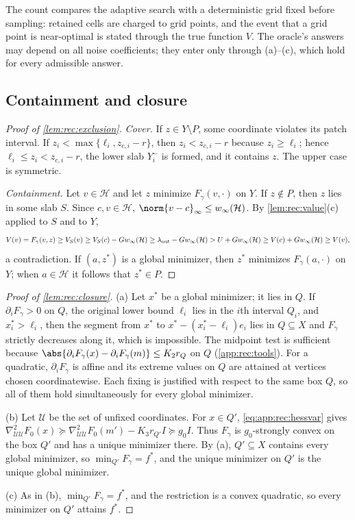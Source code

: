 The count compares the adaptive search with a deterministic grid fixed before
sampling: retained cells are charged to grid points, and the event that a grid
point is near-optimal is stated through the true function $V$. The oracle's
answers may depend on all noise coefficients; they enter only through
(a)--(c), which hold for every admissible answer.

\subsection{Containment and closure}\label{app:rec:certificates}

\begin{proof}[Proof of \cref{lem:rec:exclusion}]
\emph{Cover.} If $z\in Y\setminus P$, some coordinate violates its patch
interval. If $z_i<\max\{\ell_i,z_{c,i}-r\}$, then $z_i<z_{c,i}-r$ because
$z_i\ge\ell_i$; hence $\ell_i\le z_i<z_{c,i}-r$, the lower slab $Y_i^-$ is
formed, and it contains $z$. The upper case is symmetric.

\emph{Containment.} Let $v\in\mathcal H$ and let $z$ minimize
$F_\gamma(v,\cdot)$ on $Y$. If $z\notin P$, then $z$ lies in some slab $S$.
Since $c,v\in\mathcal H$, $\norm{v-c}_\infty\le w_\infty(\mathcal H)$. By
\cref{lem:rec:value}(c) applied to $S$ and to $Y$,
\[
 V(v)=F_\gamma(v,z)\ge V_S(v)\ge V_S(c)-Gw_\infty(\mathcal H)
 \ge\lambda_{\rm out}-Gw_\infty(\mathcal H)>U+Gw_\infty(\mathcal H)
 \ge V(c)+Gw_\infty(\mathcal H)\ge V(v),
\]
a contradiction. If $(a,z^*)$ is a global minimizer, then $z^*$ minimizes
$F_\gamma(a,\cdot)$ on $Y$; when $a\in\mathcal H$ it follows that $z^*\in P$.
\end{proof}

\begin{proof}[Proof of \cref{lem:rec:closure}]
(a) Let $x^*$ be a global minimizer; it lies in $Q$. If $\partial_iF_\gamma>0$
on $Q$, the original lower bound $\ell_i$ lies in the $i$th interval $Q_i$,
and $x^*_i>\ell_i$, then the segment from $x^*$ to
$x^*-(x^*_i-\ell_i)e_i$ lies in $Q\subseteq X$ and $F_\gamma$ strictly
decreases along it, which is impossible. The midpoint test is sufficient
because $\abs{\partial_iF_\gamma(x)-\partial_iF_\gamma(m)}\le K_2r_Q$ on $Q$
(\cref{app:rec:tools}). For a quadratic, $\partial_iF_\gamma$ is affine and
its extreme values on $Q$ are attained at vertices chosen coordinatewise.
Each fixing is justified with respect to the same box $Q$, so all of them
hold simultaneously for every global minimizer.

(b) Let $\mathcal U$ be the set of unfixed coordinates. For $x\in Q'$,
\eqref{eq:app:rec:hessvar} gives
$\nabla^2_{\mathcal U\mathcal U}F_0(x)\succeq\nabla^2_{\mathcal U\mathcal U}
F_0(m')-K_3r_{Q'}I\succeq g_0I$. Thus $F_\gamma$ is $g_0$-strongly convex on
the box $Q'$ and has a unique minimizer there. By (a), $Q'\subseteq X$
contains every global minimizer, so $\min_{Q'}F_\gamma=f^*$, and the unique
minimizer on $Q'$ is the unique global minimizer.

(c) As in (b), $\min_{Q'}F_\gamma=f^*$, and the restriction is a convex
quadratic, so every minimizer on $Q'$ attains $f^*$.
\end{proof}

